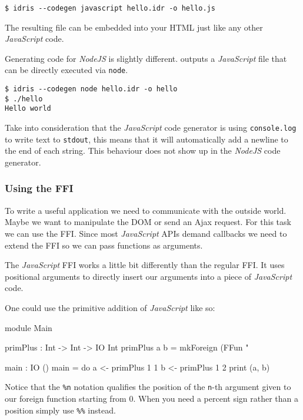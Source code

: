 \begin{lstlisting}[style=stdout]
$ idris --codegen javascript hello.idr -o hello.js
\end{lstlisting}

\noindent
The resulting file can be embedded into your HTML just like any other \emph{JavaScript} code.

\noindent
Generating code for \emph{NodeJS} is slightly different.
\Idris{} outputs a \emph{JavaScript} file that can be directly executed via \texttt{node}.

\begin{lstlisting}[style=stdout]
$ idris --codegen node hello.idr -o hello
$ ./hello
Hello world
\end{lstlisting}

\noindent
Take into consideration that the \emph{JavaScript} code generator is using \texttt{console.log} to write text to \texttt{stdout}, this means that it will automatically add a newline to the end of each string.
This behaviour does not show up in the \emph{NodeJS} code generator.

\subsubsection*{Using the FFI}

\noindent
To write a useful application we need to communicate with the outside world.
Maybe we want to manipulate the DOM or send an Ajax request.
For this task we can use the FFI.
Since most \emph{JavaScript} APIs demand callbacks we need to extend the FFI so we can pass functions as arguments.

\noindent
The \emph{JavaScript} FFI works a little bit differently than the regular FFI.
It uses positional arguments to directly insert our arguments into a piece of \emph{JavaScript} code.

\noindent
One could use the primitive addition of \emph{JavaScript} like so:

\begin{code}
module Main

primPlus : Int -> Int -> IO Int
primPlus a b = mkForeign (FFun "%

main : IO ()
main = do
  a <- primPlus 1 1
  b <- primPlus 1 2
  print (a, b)
\end{code}

\noindent
Notice that the \texttt{\%n} notation qualifies the position of the \texttt{n}-th argument given to our foreign function starting from 0.
When you need a percent sign rather than a position simply use \texttt{\%\%} instead.

